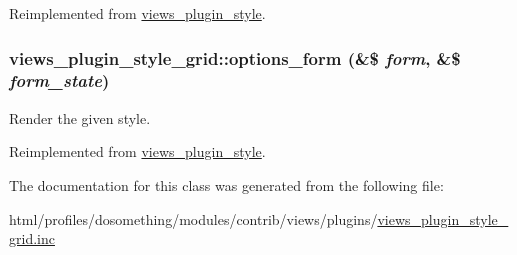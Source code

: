 Reimplemented from \hyperlink{classviews__plugin__style}{views\_\-plugin\_\-style}.\hypertarget{classviews__plugin__style__grid_a275eb0e00406028e000268ae389d17a3}{
\subsubsection[{options\_\-form}]{\setlength{\rightskip}{0pt plus 5cm}views\_\-plugin\_\-style\_\-grid::options\_\-form (\&\$ {\em form}, \/  \&\$ {\em form\_\-state})}}
\label{classviews__plugin__style__grid_a275eb0e00406028e000268ae389d17a3}
Render the given style. 

Reimplemented from \hyperlink{classviews__plugin__style_afe3d437ff4398315b15c4e60975dbb1c}{views\_\-plugin\_\-style}.

The documentation for this class was generated from the following file:\begin{DoxyCompactItemize}
\item 
html/profiles/dosomething/modules/contrib/views/plugins/\hyperlink{views__plugin__style__grid_8inc}{views\_\-plugin\_\-style\_\-grid.inc}\end{DoxyCompactItemize}

